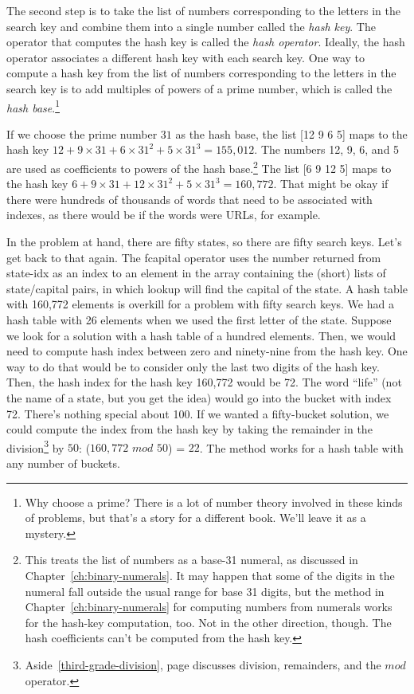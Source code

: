 The second step is to take the list of numbers corresponding
to the letters in the search key
and combine them into a single number called
the \emph{hash key}.
The operator that computes the hash key is called
the \emph{hash operator}.
Ideally, the hash operator associates a different hash key
with each search key.
One way to compute a hash key from the list of numbers
corresponding to the letters in the search key is
to add multiples of powers of a
prime number, which is called the
\emph{hash base}.\footnote{Why choose a prime?
There is a lot of number theory involved in these kinds
of problems, but that's a story for a different book.
We'll leave it as a mystery.}

If we choose the prime number $31$
as the hash base, the list \textsf{[12 9 6 5]} maps to the hash key
$12 + 9\times31 + 6\times31^2 + 5\times31^3 = 155,012$.
The numbers 12, 9, 6, and 5 are used as coefficients to powers of
the hash base.\footnote{This treats the
list of numbers as a base-31 numeral, as
discussed in Chapter~\ref{ch:binary-numerals}.
It may happen that some of the digits in the numeral
fall outside the usual range for base 31 digits,
but the method in Chapter~\ref{ch:binary-numerals}
for computing numbers from numerals works
for the hash-key computation, too. Not in the other direction, though.
The hash coefficients can't be computed from the hash key.}
The list \textsf{[6 9 12 5]} maps to the hash key
$6 + 9\times31 + 12\times31^2 + 5\times31^3 = 160,772$.
That might be okay if there were hundreds of thousands of words
that need to be associated with indexes, as there would be
if the words were URLs, for example.

In the problem at hand, there are fifty states,
so there are fifty search keys.
Let's get back to that again.
The \textsf{fcapital} operator uses the
number returned from \textsf{state-idx} as an index to
an element in the array containing the (short) lists of
state/capital pairs, in which
\textsf{lookup} will find the capital of the state.
A hash table with 160,772 elements is overkill for
a problem with fifty search keys.
We had a hash table with 26 elements when we used the first letter of the state.
Suppose we look for a solution with a hash table of a hundred elements.
Then, we would need to compute hash index between zero and ninety-nine
from the hash key. One way to do that would be to
consider only the last two digits of the hash key.
Then, the hash index for the hash key 160,772 would be 72.
The word ``life'' (not the name of a state, but you get the idea)
would go into the bucket
with index 72.
There's nothing special about 100.
If we wanted a fifty-bucket solution,
we could compute the index from the hash key by taking the
remainder in the division\footnote{Aside~\ref{third-grade-division},
page \pageref{third-grade-division} discusses
division, remainders, and the $mod$ operator.}
by  $50$: ($160,772$ $mod$ $50$) = $22$.
The method works for a hash table with any number of buckets.


